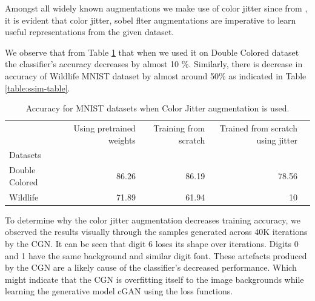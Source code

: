 Amongst all widely known augmentations we make use of color jitter since from \cite{chen2020simple}, \cite{he2020momentum} it is evident that color jitter, sobel flter augmentations are imperative to learn useful representations from the given dataset. 

We observe that from Table \ref{table:colorjitter-table} that when we used it on Double Colored dataset the classifier's accuracy decreases by almost 10 \%. Similarly, there is decrease in accuracy of Wildlife MNIST dataset by almost around 50\% as indicated in Table \ref{table:ssim-table}. 


 


\begin{table}[h]
\centering
\begin{tabular}{lrrrr}
\toprule
{} & Using pretrained weights &  Training from scratch & Trained from scratch using jitter\\
Datasets  &              &              &                            \\
\midrule
Double Colored              &        86.26  &        86.19 &         78.56  \\
Wildlife              &        71.89 &        61.94 &         10  \\
\bottomrule
\end{tabular}
\caption{Accuracy for MNIST datasets when Color Jitter augmentation is used.   }
\label{table:colorjitter-table}
\end{table}


To determine why the color jitter augmentation decreases training accuracy, we observed the results visually through the samples generated across 40K iterations by the CGN. 
  It can be seen that digit 6 loses its shape over iterations. Digits 0 and 1 have the same background and similar digit font. These artefacts produced by the CGN\cite{sauer2021counterfactual} are a likely cause of the classifier's decreased performance. Which might indicate that the CGN is overfitting itself to the image backgrounds while learning the generative model cGAN using the loss functions. 

